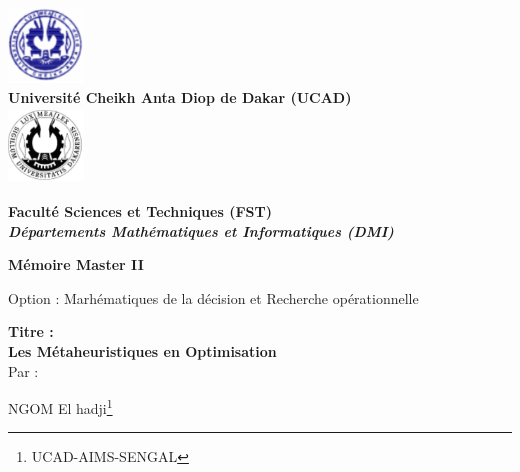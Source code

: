 \documentclass[a4paper,11pt,oneside]{report}
\theoremstyle{plain}
\newcommand{\0}{/ \! \! \! 0}
\theoremstyle{plain}
\begin{document}
\dominitoc

\begin{titlepage}
\begin{center}
\includegraphics[height=2cm,width=2cm]{UcadLogo.pdf} \\ 
{\bf Universit\'e Cheikh Anta Diop de Dakar (UCAD)} \\
\includegraphics[height=2cm,width=2cm]{logo.pdf}

\vspace{0.2cm}
{\bf Facult\'e Sciences et Techniques (FST)}\\
\vspace{0.2cm}
{{\bf\it D\'epartements Math\'ematiques et Informatiques (DMI)\\}}
\end{center}


\vspace{1.2cm}

\begin{center}

{\bf M\'emoire Master II \\
\vskip 0.2cm 

Option : Marh\'ematiques de la d\'ecision et Recherche op\'erationnelle\\}

\vspace{1.5cm}
{\bf Titre :\\}
{\Large\bf Les M\'etaheuristiques en Optimisation\\ }
\vspace{0.5cm}
Par :

\vspace{1cm}

NGOM El hadji\footnote{UCAD-AIMS-SENGAL}\\

\vspace{1cm}


\end{center}
\end{titlepage}
\end{document}
